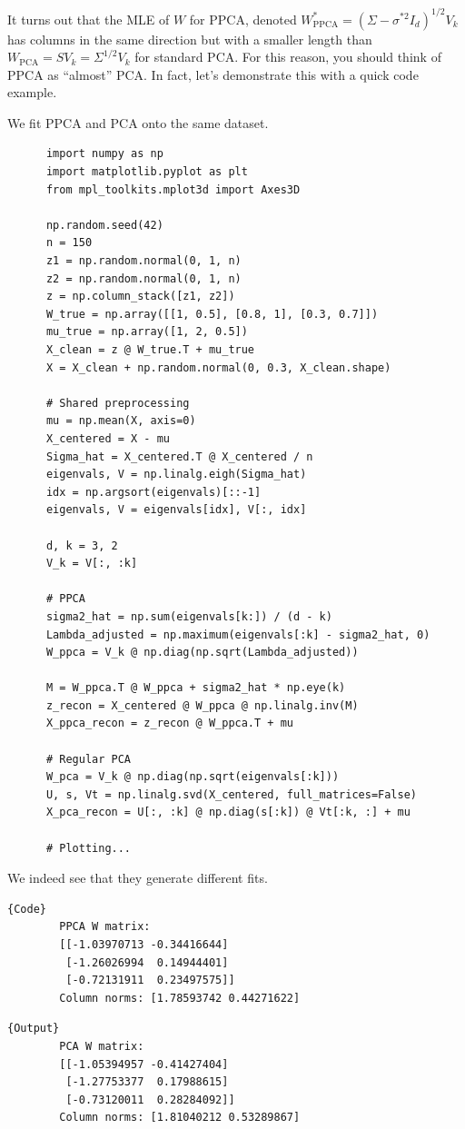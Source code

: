   It turns out that the MLE of $W$ for PPCA, denoted $W_{\mathrm{PPCA}}^\ast = (\Sigma - \sigma^{\ast 2} I_d)^{1/2} V_k$ has columns in the same direction but with a smaller length than $W_{\mathrm{PCA}} = S V_k = \Sigma^{1/2} V_k$ for standard PCA. For this reason, you should think of PPCA as ``almost'' PCA. In fact, let's demonstrate this with a quick code example. 

  \begin{example}
    We fit PPCA and PCA onto the same dataset. 
    \begin{lstlisting}
      import numpy as np
      import matplotlib.pyplot as plt
      from mpl_toolkits.mplot3d import Axes3D

      np.random.seed(42)
      n = 150
      z1 = np.random.normal(0, 1, n)
      z2 = np.random.normal(0, 1, n)
      z = np.column_stack([z1, z2])
      W_true = np.array([[1, 0.5], [0.8, 1], [0.3, 0.7]])
      mu_true = np.array([1, 2, 0.5])
      X_clean = z @ W_true.T + mu_true
      X = X_clean + np.random.normal(0, 0.3, X_clean.shape)

      # Shared preprocessing
      mu = np.mean(X, axis=0)
      X_centered = X - mu
      Sigma_hat = X_centered.T @ X_centered / n
      eigenvals, V = np.linalg.eigh(Sigma_hat)
      idx = np.argsort(eigenvals)[::-1]
      eigenvals, V = eigenvals[idx], V[:, idx]

      d, k = 3, 2
      V_k = V[:, :k]

      # PPCA
      sigma2_hat = np.sum(eigenvals[k:]) / (d - k)
      Lambda_adjusted = np.maximum(eigenvals[:k] - sigma2_hat, 0)
      W_ppca = V_k @ np.diag(np.sqrt(Lambda_adjusted))

      M = W_ppca.T @ W_ppca + sigma2_hat * np.eye(k)
      z_recon = X_centered @ W_ppca @ np.linalg.inv(M)
      X_ppca_recon = z_recon @ W_ppca.T + mu

      # Regular PCA
      W_pca = V_k @ np.diag(np.sqrt(eigenvals[:k]))
      U, s, Vt = np.linalg.svd(X_centered, full_matrices=False)
      X_pca_recon = U[:, :k] @ np.diag(s[:k]) @ Vt[:k, :] + mu

      # Plotting...
    \end{lstlisting}
    We indeed see that they generate different fits. 

    \noindent\begin{minipage}{.5\textwidth}
      \begin{lstlisting}[]{Code}
        PPCA W matrix:
        [[-1.03970713 -0.34416644]
         [-1.26026994  0.14944401]
         [-0.72131911  0.23497575]]
        Column norms: [1.78593742 0.44271622]
      \end{lstlisting}
      \end{minipage}
      \hfill
      \begin{minipage}{.49\textwidth}
      \begin{lstlisting}[]{Output}
        PCA W matrix:
        [[-1.05394957 -0.41427404]
         [-1.27753377  0.17988615]
         [-0.73120011  0.28284092]]
        Column norms: [1.81040212 0.53289867]
      \end{lstlisting}
    \end{minipage}


\end{example}
